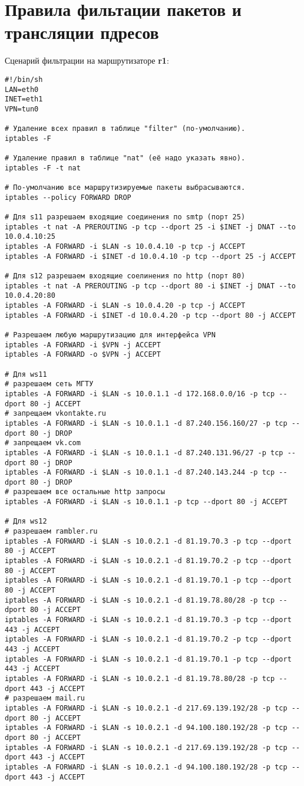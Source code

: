\documentclass[a4paper,12pt]{article}
\begin{document}
\section{Правила фильтации пакетов и трансляции пдресов}

Сценарий фильтрации на маршрутизаторе \textbf{r1}:

\begin{Verbatim}
#!/bin/sh
LAN=eth0
INET=eth1
VPN=tun0

# Удаление всех правил в таблице "filter" (по-умолчанию).
iptables -F

# Удаление правил в таблице "nat" (её надо указать явно).
iptables -F -t nat

# По-умолчанию все маршрутизируемые пакеты выбрасываются.
iptables --policy FORWARD DROP

# Для s11 разрешаем входящие соединения по smtp (порт 25)
iptables -t nat -A PREROUTING -p tcp --dport 25 -i $INET -j DNAT --to 10.0.4.10:25
iptables -A FORWARD -i $LAN -s 10.0.4.10 -p tcp -j ACCEPT
iptables -A FORWARD -i $INET -d 10.0.4.10 -p tcp --dport 25 -j ACCEPT

# Для s12 разрешаем входящие соелинения по http (порт 80)
iptables -t nat -A PREROUTING -p tcp --dport 80 -i $INET -j DNAT --to 10.0.4.20:80
iptables -A FORWARD -i $LAN -s 10.0.4.20 -p tcp -j ACCEPT
iptables -A FORWARD -i $INET -d 10.0.4.20 -p tcp --dport 80 -j ACCEPT

# Разрешаем любую маршрутизацию для интерфейса VPN
iptables -A FORWARD -i $VPN -j ACCEPT
iptables -A FORWARD -o $VPN -j ACCEPT

# Для ws11
# разрешаем сеть МГТУ
iptables -A FORWARD -i $LAN -s 10.0.1.1 -d 172.168.0.0/16 -p tcp --dport 80 -j ACCEPT
# запрещаем vkontakte.ru
iptables -A FORWARD -i $LAN -s 10.0.1.1 -d 87.240.156.160/27 -p tcp --dport 80 -j DROP
# запрещаем vk.com
iptables -A FORWARD -i $LAN -s 10.0.1.1 -d 87.240.131.96/27 -p tcp --dport 80 -j DROP
iptables -A FORWARD -i $LAN -s 10.0.1.1 -d 87.240.143.244 -p tcp --dport 80 -j DROP
# разрешаем все остальные http запросы
iptables -A FORWARD -i $LAN -s 10.0.1.1 -p tcp --dport 80 -j ACCEPT

# Для ws12
# разрешаем rambler.ru
iptables -A FORWARD -i $LAN -s 10.0.2.1 -d 81.19.70.3 -p tcp --dport 80 -j ACCEPT
iptables -A FORWARD -i $LAN -s 10.0.2.1 -d 81.19.70.2 -p tcp --dport 80 -j ACCEPT
iptables -A FORWARD -i $LAN -s 10.0.2.1 -d 81.19.70.1 -p tcp --dport 80 -j ACCEPT
iptables -A FORWARD -i $LAN -s 10.0.2.1 -d 81.19.78.80/28 -p tcp --dport 80 -j ACCEPT
iptables -A FORWARD -i $LAN -s 10.0.2.1 -d 81.19.70.3 -p tcp --dport 443 -j ACCEPT
iptables -A FORWARD -i $LAN -s 10.0.2.1 -d 81.19.70.2 -p tcp --dport 443 -j ACCEPT
iptables -A FORWARD -i $LAN -s 10.0.2.1 -d 81.19.70.1 -p tcp --dport 443 -j ACCEPT
iptables -A FORWARD -i $LAN -s 10.0.2.1 -d 81.19.78.80/28 -p tcp --dport 443 -j ACCEPT
# разрешаем mail.ru
iptables -A FORWARD -i $LAN -s 10.0.2.1 -d 217.69.139.192/28 -p tcp --dport 80 -j ACCEPT
iptables -A FORWARD -i $LAN -s 10.0.2.1 -d 94.100.180.192/28 -p tcp --dport 80 -j ACCEPT
iptables -A FORWARD -i $LAN -s 10.0.2.1 -d 217.69.139.192/28 -p tcp --dport 443 -j ACCEPT
iptables -A FORWARD -i $LAN -s 10.0.2.1 -d 94.100.180.192/28 -p tcp --dport 443 -j ACCEPT



\end{Verbatim}
\end{document}
